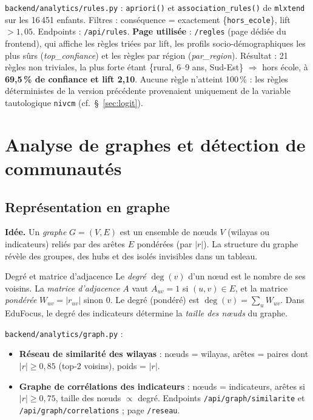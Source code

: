 \documentclass[11pt,a4paper]{article}
\newcommand{\txt}[1]{\texttt{#1}}
\begin{document}
\begin{where}
\txt{backend/analytics/rules.py} : \txt{apriori()} et
\txt{association\_rules()} de \texttt{mlxtend} sur les 16\,451 enfants.
Filtres : conséquence = exactement \{\txt{hors\_ecole}\}, lift $>1{,}05$.
Endpoints : \txt{/api/rules}.
\textbf{Page utilisée} : \txt{/regles} (page dédiée du frontend), qui
affiche les règles triées par lift, les profils socio-démographiques les plus
sûrs (\emph{top\_confiance}) et les règles par région (\emph{par\_region}).
Résultat : 21 règles non triviales, la plus forte étant
\{rural, 6--9 ans, Sud-Est\} $\Rightarrow$ hors école, à
\textbf{69{,}5\,\% de confiance et lift 2{,}10}. Aucune règle n'atteint
100\,\% : les règles déterministes de la version précédente provenaient
uniquement de la variable tautologique \txt{nivcm} (cf.\ §~\ref{sec:logit}).
\end{where}

\section{Analyse de graphes et détection de communautés}
\label{sec:graphs}

\subsection{Représentation en graphe}

\textbf{Idée.} Un \emph{graphe} $G=(V,E)$ est un ensemble de nœuds $V$
(wilayas ou indicateurs) reliés par des arêtes $E$ pondérées (par $|r|$).
La structure du graphe révèle des groupes, des hubs et des isolés invisibles
dans un tableau.

\begin{meth}{Degré et matrice d'adjacence}
Le \emph{degré} $\deg(v)$ d'un nœud est le nombre de ses voisins.
La \emph{matrice d'adjacence} $A$ vaut $A_{uv}=1$ si $(u,v)\in E$, et la
matrice \emph{pondérée} $W_{uv}=|r_{uv}|$ sinon $0$. Le degré (pondéré) est
$\deg(v)=\sum_u W_{uv}$. Dans EduFocus, le degré des indicateurs détermine
la \emph{taille des nœuds} du graphe.
\end{meth}

\begin{where}
\txt{backend/analytics/graph.py} :
\begin{itemize}[leftmargin=2em]
  \item \textbf{Réseau de similarité des wilayas} : nœuds = wilayas, arêtes =
        paires dont $|r|\ge0{,}85$ (top-2 voisins), poids = $|r|$.
  \item \textbf{Graphe de corrélations des indicateurs} : nœuds =
        indicateurs, arêtes si $|r|\ge0{,}75$, taille des nœuds $\propto$
        degré. Endpoints \txt{/api/graph/similarite} et
        \txt{/api/graph/correlations} ; page \txt{/reseau}.
\end{itemize}
\end{where}
\end{document}
